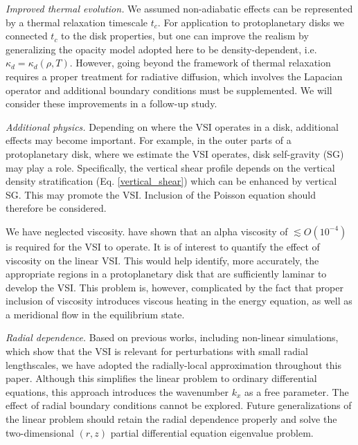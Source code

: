 \emph{Improved thermal evolution.} We assumed non-adiabatic effects
can be represented by a thermal relaxation timescale $t_c$. For 
application to protoplanetary disks we connected $t_c$ to the disk
properties, but one can improve the realism by generalizing the
opacity model adopted here to be density-dependent,  i.e. $\kappa_d =
\kappa_d(\rho, T)$.  However, going beyond the framework of thermal
relaxation requires a proper treatment for radiative diffusion, which
involves the Lapacian operator and additional boundary conditions
must be supplemented. We will consider these improvements in a
follow-up study. 
 
\emph{Additional physics.} Depending on where the VSI operates in a
disk, additional effects may become important. For example, in the
outer parts of a protoplanetary disk, where we estimate the VSI 
operates, disk self-gravity (SG) may play a role. Specifically, the vertical
shear profile depends on the vertical density stratification
(Eq. \ref{vertical_shear}) which can be enhanced by vertical SG. This
may promote the VSI. Inclusion of the Poisson equation should
therefore be considered.  

We have neglected viscosity. \cite{nelson13} have shown that an
alpha viscosity of $\lesssim O(10^{-4})$ is required for the VSI to
operate. It is of interest to quantify the effect of viscosity
on the linear VSI. This would help identify, more accurately, the
appropriate regions in a protoplanetary disk that are sufficiently
laminar to develop the VSI.  This problem is, however, complicated by
the fact that proper inclusion of viscosity introduces viscous heating
in the energy equation, as well as a meridional flow in the equilibrium state.  


\emph{Radial dependence.} Based on previous works, including
non-linear simulations, which show that the VSI is relevant for
perturbations with small radial lengthscales, we have adopted the
radially-local approximation throughout this paper.  Although this
simplifies the linear problem to ordinary differential equations, this
approach introduces the wavenumber $k_x$ as a free parameter. The
effect of radial boundary conditions cannot be explored. Future 
generalizations of the linear problem should retain the radial
dependence properly and solve the two-dimensional $(r,z)$ partial 
differential equation eigenvalue problem. 



